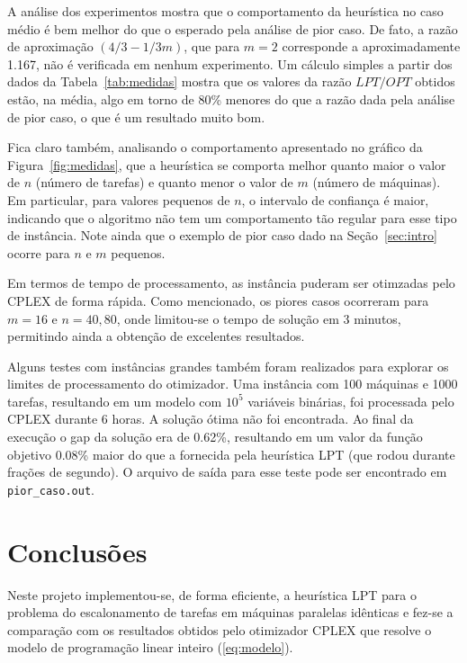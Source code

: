 \documentclass[12pt,a4paper]{article}
\newcommand{\zerar}{\setcounter{equation}{0}\setcounter{figure}{0}\setcounter{table}{0}}
\begin{document}
A análise dos experimentos mostra que o comportamento da heurística no caso médio é bem melhor do 
que o esperado pela análise de pior caso. De fato, a razão de aproximação $(4/3 - 1/3m)$, que para
$m = 2$ corresponde a aproximadamente 1.167, não é verificada em nenhum experimento. Um cálculo 
simples a partir dos dados da Tabela~\ref{tab:medidas} mostra que os valores da razão $LPT/OPT$ 
obtidos estão, na média, algo em torno de 80\% menores do que a razão dada pela análise de pior 
caso, o que é um resultado muito bom. 

Fica claro também, analisando o comportamento apresentado no gráfico da Figura~\ref{fig:medidas},
que a heurística se comporta melhor quanto maior o valor de $n$ (número de tarefas) e quanto menor o
valor de $m$ (número de máquinas). Em particular, para valores pequenos de $n$, o intervalo de 
confiança é maior, indicando que o algoritmo não tem um comportamento tão regular para esse tipo de 
instância. Note ainda que o exemplo de pior caso dado na Seção~\ref{sec:intro} ocorre para $n$ e $m$ 
pequenos.

Em termos de tempo de processamento, as instância puderam ser otimzadas pelo CPLEX de forma rápida.
Como mencionado, os piores casos ocorreram para $m = 16$ e $n = 40, 80$, onde limitou-se o tempo de
solução em 3 minutos, permitindo ainda a obtenção de excelentes resultados. 

Alguns testes com instâncias grandes também foram realizados para explorar os limites de 
processamento do otimizador. Uma instância com 100 máquinas e 1000 tarefas, resultando em um modelo 
com $10^5$ variáveis binárias, foi processada pelo CPLEX durante 6 horas. A solução ótima não foi 
encontrada. Ao final da execução o gap da solução era de 0.62\%, resultando em um valor da função 
objetivo 0.08\% maior do que a fornecida pela heurística LPT (que rodou durante frações de segundo). 
O arquivo de saída para esse teste pode ser encontrado em \verb|pior_caso.out|.


\zerar
\section{Conclusões}

Neste projeto implementou-se, de forma eficiente, a heurística LPT para o problema do escalonamento 
de tarefas em máquinas paralelas idênticas e fez-se a comparação com os resultados obtidos pelo
otimizador CPLEX que resolve o modelo de programação linear inteiro (\ref{eq:modelo}).
\end{document}

